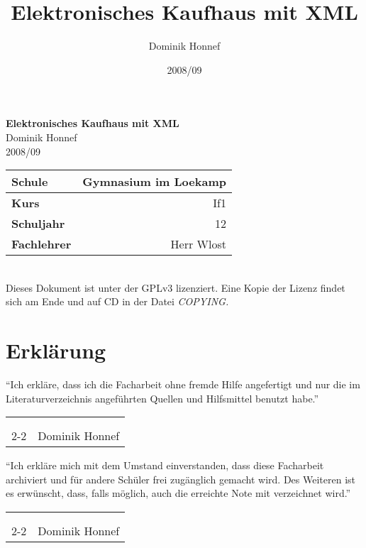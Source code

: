 \documentclass[12pt,oneside,ngerman,a4paper,bibgerm]{scrreprt}
\author{Dominik Honnef}
\title{Elektronisches Kaufhaus mit XML}
\date{2008/09}
\makeatletter
\newcommand{\signature}[1]{
  \vspace*{\bigskipamount}
  \hfill
  \begin{tabularx}{0.95\linewidth}{Xr}
    \\
    \\
    \\
    \cline{2-2}
    & \makebox[4cm][r]#1
  \end{tabularx}
  \vspace*{\bigskipamount}
}
\renewcommand*{\lstlistoflistings}{%
  \begingroup
    \if@twocolumn
      \@restonecoltrue\onecolumn
    \else
      \@restonecolfalse
    \fi
    \lol@heading
    \setlength{\parskip}{\z@}%
    \setlength{\parindent}{\z@}%
    \setlength{\parfillskip}{\z@ \@plus 1fil}%
    \@starttoc{lol}%
    \if@restonecol\twocolumn\fi
  \endgroup
}
\renewcommand*{\chapterpagestyle}{scrheadings}
\makeatother
\begin{document}
\onehalfspacing
\clearpage
\begingroup
{}
\renewcommand*{\chapterpagestyle}{empty}
\pagestyle{empty}
\vspace*{\fill}
\begin{center}
  \textbf{\huge{Elektronisches Kaufhaus mit XML}} \\
  \bigskip
  \small{Dominik Honnef} \\
  \bigskip
  \small{2008/09}
\end{center}
\vspace*{\fill}
\begin{tabular}{|l|r|}
  \hline
  \textbf{Schule} & Gymnasium im Loekamp \\
  \hline
  \textbf{Kurs} & If1 \\
  \hline
  \textbf{Schuljahr} & 12 \\
  \hline
  \textbf{Fachlehrer} & Herr Wlost \\
  \hline
\end{tabular} \\
{\tiny Dieses Dokument ist unter der GPLv3 lizenziert. Eine Kopie der Lizenz findet sich am Ende und auf CD in der Datei {\em COPYING.}}
\clearpage
\tableofcontents{}
\clearpage
\endgroup
\newpage








\chapter*{Erklärung}
"`Ich erkläre, dass ich die Facharbeit ohne fremde
Hilfe angefertigt und nur die
im Literaturverzeichnis angeführten Quellen und Hilfsmittel benutzt habe."' \\
\signature{Dominik Honnef}

"`Ich erkläre mich mit dem Umstand einverstanden, dass diese
Facharbeit archiviert und für andere Schüler frei zugänglich gemacht
wird. Des Weiteren ist es erwünscht, dass, falls möglich, auch die
erreichte Note mit verzeichnet wird."' \\
\signature{Dominik Honnef}
\end{document}
